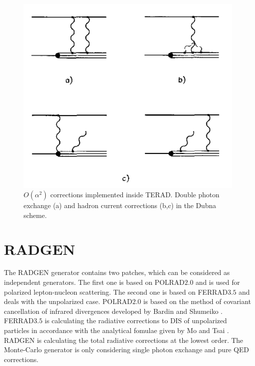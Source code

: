 \begin{figure}[!h]
  \centering
	\includegraphics[scale=0.8]{./gfx/order2corr.png}
	\caption{$O(\alpha^2)$ corrections implemented inside TERAD. Double photon exchange (a) and hadron current corrections (b,c) in the Dubna scheme.}
	\label{pic:order2corr}
\end{figure}


\section{RADGEN}

The RADGEN generator \cite{RADGEN} contains two patches, which can be considered as independent generators. The first one is based on POLRAD$2.0$ \cite{POLRAD} and is used for polarized lepton-nucleon scattering. The second one is based on FERRAD$3.5$ \cite{FERRAD} and deals with the unpolarized case.
POLRAD$2.0$ is based on the method of covariant cancellation of infrared divergences developed by Bardin and Shumeiko \cite{BardinShu}. FERRAD$3.5$ is calculating the radiative corrections to DIS of unpolarized particles in accordance with the analytical fomulae given by Mo and Tsai \cite{MoTsai}. RADGEN is calculating the total radiative corrections at the lowest order. The Monte-Carlo generator is only considering single photon exchange and pure QED corrections.

